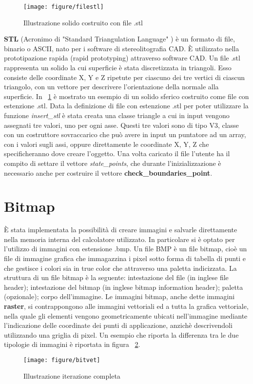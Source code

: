 {\begin{figure}[!htb]
	\begin{center}
		\texttt{[image: figure/filestl]}
	\end{center}
	\caption{Illustrazione solido costruito con file .stl \label{fig:filestl}}
\end{figure}\hfill

\textbf{STL} (Acronimo di "Standard Triangulation Language" ) \`e un formato di file, binario o ASCII, nato per i software di stereolitografia CAD. \`E utilizzato nella prototipazione rapida (rapid prototyping) attraverso software CAD.
Un file .stl rappresenta un solido la cui superficie \`e stata discretizzata in triangoli. Esso consiste delle coordinate X, Y e Z ripetute per ciascuno dei tre vertici di ciascun triangolo, con un vettore per descrivere l'orientazione della normale alla superficie. In \figurename~\ref{fig:filestl} \`e mostrato un esempio di un solido sferico costruito come file con estenzione .stl.
Data la definizione di file con estenzione .stl per poter utilizzare la funzione \textit{insert\_stl} \`e stata creata una classe triangle a cui in input vengono assegnati tre valori, uno per ogni asse. Questi tre valori sono di tipo V3, classe con un costruttore sovraccarico che pu\`o avere in input un puntatore ad un array, con i valori sugli assi, oppure direttamente le coordinate X, Y, Z che specificheranno dove creare l'oggetto.
Una volta caricato il file l'utente ha il compito di settare il vettore \textit{state\_points}, che durante l'inizializzazione \`e necessario anche per costruire il vettore \textbf{check\_boundaries\_point}.

\section{Bitmap}
\`E stata implementata la possibilit\`a di creare immagini e salvarle direttamente nella memoria interna del calcolatore utilizzato. In particolare si \`e optato per l'utilizzo di immagini con estensione .bmp. Un file BMP è un file bitmap, cio\`e un file di immagine grafica che immagazzina i pixel sotto forma di tabella di punti e che gestisce i colori sia in true color che attraverso una paletta indicizzata. La struttura di un file bitmap \`e la seguente: intestazione del file (in inglese file header); intestazione del bitmap (in inglese bitmap information header); paletta (opzionale); corpo dell'immagine.
Le immagini bitmap, anche dette immagini \textbf{raster}, si contrappongono alle immagini vettoriali ed a tutta la grafica vettoriale, nella quale gli elementi vengono geometricamente ubicati nell'immagine mediante l'indicazione delle coordinate dei punti di applicazione, anzich\`e descrivendoli utilizzando una griglia di pixel. Un esempio che riporta la differenza tra le due tipologie di immagini \`e riportata in figura \figurename~\ref{fig:bitvet}.
\begin{figure}[!htb]
	\begin{center}
		\texttt{[image: figure/bitvet]}
	\end{center}
	\caption{Illustrazione iterazione completa \label{fig:bitvet}}
\end{figure}\hfill

}
